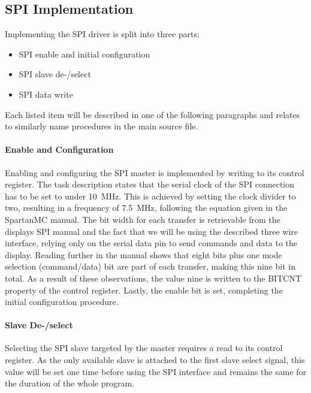 		\subsection{SPI Implementation} %
		\label{sub:impl_spi_implementation}
			Implementing the SPI driver is split into three parts:

			\begin{itemize}
				\item SPI enable and initial configuration
				\item SPI slave de-/select
				\item SPI data write
	   		\end{itemize}

	   		Each listed item will be described in one of the following paragraphs and relates to similarly name procedures in the main source file.

	   		\paragraph{Enable and Configuration} %
	   		\label{par:enable}
	   			Enabling and configuring the SPI master is implemented by writing to its control register. The task description states that the serial clock of the SPI connection has to be set to under \SI{10}{\mega\hertz}. This is achieved by setting the clock divider to two, resulting in a frequency of \SI{7.5}{\mega\hertz}, following the equation given in the SpartanMC manual. The bit width for each transfer is retrievable from the displays SPI manual and the fact that we will be using the described three wire interface, relying only on the serial data pin to send commands and data to the display. Reading further in the manual shows that eight bits plus one mode selection (command/data) bit are part of each transfer, making this nine bit in total. As a result of these observations, the value nine is written to the BITCNT property of the control register. Lastly, the enable bit is set, completing the initial configuration procedure.

	   		\paragraph{Slave De-/select} %
	   		\label{par:slave_de_select}
	   			Selecting the SPI slave targeted by the master requires a read to its control register. As the only available slave is attached to the first slave select signal, this value will be set one time before using the SPI interface and remains the same for the duration of the whole program.

